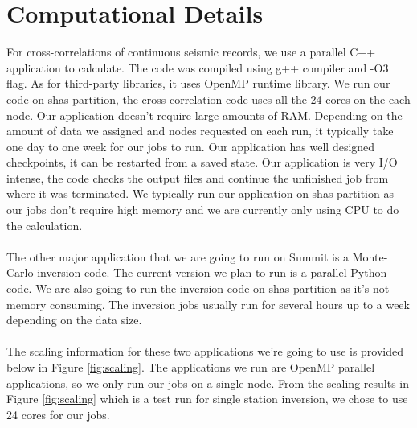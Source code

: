 \documentclass[10pt, letterpaper]{article}
\begin{document}
\section{Computational Details}\label{sec:method}

For cross-correlations of continuous seismic records, we use a parallel C++ application to calculate. The code was compiled using g++ compiler and -O3 flag. As for third-party libraries, it uses OpenMP runtime library. We run our code on shas partition, the cross-correlation code uses all the 24 cores on the each node. Our application doesn't require large amounts of RAM. Depending on the amount of data we assigned and nodes requested on each run, it typically take one day to one week for our jobs to run. Our application has well designed checkpoints, it can be restarted from a saved state. Our application is very I/O intense, the code checks the output files and continue the unfinished job from where it was terminated. We typically run our application on shas partition as our jobs don't require high memory and we are currently only using CPU to do the calculation. \\ \\
The other major application that we are going to run on Summit is a Monte-Carlo inversion code. The current version we plan to run is a parallel Python code. We are also going to run the inversion code on shas partition as it's not memory consuming. The inversion jobs usually run for several hours up to a week depending on the data size. \\ \\
The scaling information for these two applications we're going to use is provided below in Figure \ref{fig:scaling}. The applications we run are OpenMP parallel applications, so we only run our jobs on a single node. From the scaling results in Figure \ref{fig:scaling} which is a test run for single station inversion, we chose to use 24 cores for our jobs.
\end{document}
